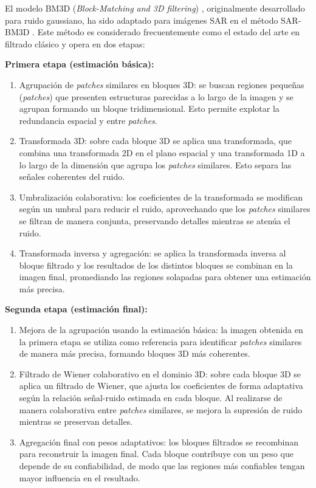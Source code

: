 El modelo BM3D (\emph{Block-Matching and 3D filtering}) \cite{dabov2007image}, originalmente desarrollado para ruido gaussiano, ha sido adaptado para imágenes SAR en el método SAR-BM3D \cite{parrilli2012nonlocal}. Este método es considerado frecuentemente como el estado del arte en filtrado clásico y opera en dos etapas:

\textbf{Primera etapa (estimación básica):}
\begin{enumerate}
    \item Agrupación de \emph{patches} similares en bloques 3D: se buscan regiones pequeñas (\emph{patches}) que presenten estructuras parecidas a lo largo de la imagen y se agrupan formando un bloque tridimensional. Esto permite explotar la redundancia espacial y entre \emph{patches}.
	\item Transformada 3D: sobre cada bloque 3D se aplica una transformada, que combina una transformada 2D en el plano espacial y una transformada 1D a lo largo de la dimensión que agrupa los \emph{patches} similares. Esto separa las señales coherentes del ruido.
	\item Umbralización colaborativa: los coeficientes de la transformada se modifican según un umbral para reducir el ruido, aprovechando que los \emph{patches} similares se filtran de manera conjunta, preservando detalles mientras se atenúa el ruido.
	\item Transformada inversa y agregación: se aplica la transformada inversa al bloque filtrado y los resultados de los distintos bloques se combinan en la imagen final, promediando las regiones solapadas para obtener una estimación más precisa.
\end{enumerate}

\textbf{Segunda etapa (estimación final):}
\begin{enumerate}
	\item Mejora de la agrupación usando la estimación básica: la imagen obtenida en la primera etapa se utiliza como referencia para identificar \emph{patches} similares de manera más precisa, formando bloques 3D más coherentes.
	\item Filtrado de Wiener colaborativo en el dominio 3D: sobre cada bloque 3D se aplica un filtrado de Wiener, que ajusta los coeficientes de forma adaptativa según la relación señal-ruido estimada en cada bloque. Al realizarse de manera colaborativa entre \emph{patches} similares, se mejora la supresión de ruido mientras se preservan detalles.
	\item Agregación final con pesos adaptativos: los bloques filtrados se recombinan para reconstruir la imagen final. Cada bloque contribuye con un peso que depende de su confiabilidad, de modo que las regiones más confiables tengan mayor influencia en el resultado.
\end{enumerate}

